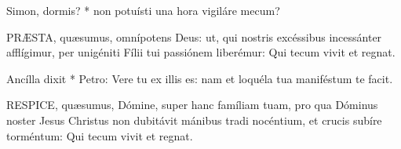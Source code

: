  Simon, dormis? * non potuísti una hora vigiláre mecum?


\lettrine[lines=2]{P}{RÆSTA}, quæsumus, omnípotens Deus: ut, qui nostris excéssibus incessánter afflígimur, per unigéniti Fílii tui passiónem liberémur: Qui tecum vivit et regnat.


 Ancílla dixit * Petro: Vere tu ex illis es: nam et loquéla tua maniféstum te facit.


\lettrine[lines=2]{R}{ESPICE}, quæsumus, Dómine, super hanc famíliam tuam, pro qua Dóminus noster Jesus Christus non dubitávit mánibus tradi nocéntium, et crucis subíre torméntum: Qui tecum vivit et regnat.

\sectionornament



